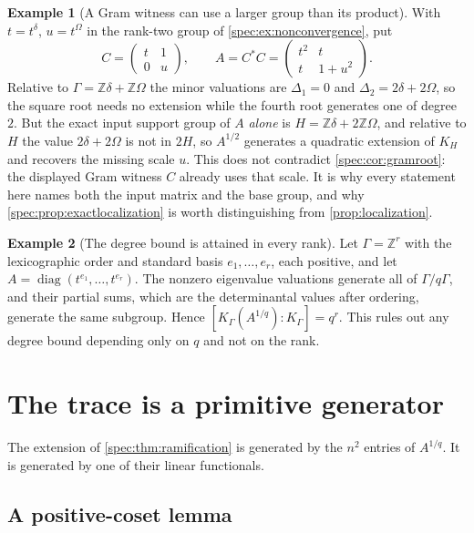 \documentclass[11pt,a4paper]{article}
\numberwithin{equation}{section}
\theoremstyle{definition}
\newtheorem{example}[example]{Example}
\theoremstyle{remark}
\newcommand{\Z}{\mathbb Z}
\newcommand{\diag}{\operatorname{diag}}
\begin{document}
\begin{example}[A Gram witness can use a larger group than its product]\label{spec:ex:gramwitness}
With $t=t^\delta$, $u=t^\Omega$ in the rank-two group of
\cref{spec:ex:nonconvergence}, put
\[
 C=\begin{pmatrix}t&1\\0&u\end{pmatrix},\qquad
 A=C^*C=\begin{pmatrix}t^2&t\\t&1+u^2\end{pmatrix}.
\]
Relative to $\Gamma=\Z\delta+\Z\Omega$ the minor valuations are
$\Delta_1=0$ and $\Delta_2=2\delta+2\Omega$, so the square root needs no
extension while the fourth root generates one of degree $2$. But the exact
input support group of $A$ \emph{alone} is $H=\Z\delta+2\Z\Omega$, and
relative to $H$ the value $2\delta+2\Omega$ is not in $2H$, so $A^{1/2}$
generates a quadratic extension of $K_H$ and recovers the missing scale $u$.
This does not contradict \cref{spec:cor:gramroot}: the displayed Gram
witness $C$ already uses that scale. It is why every statement here names
both the input matrix and the base group, and why
\cref{spec:prop:exactlocalization} is worth distinguishing from
\cref{prop:localization}.
\end{example}

\begin{example}[The degree bound is attained in every rank]\label{spec:ex:sharpdegree}
Let $\Gamma=\Z^r$ with the lexicographic order and standard basis
$e_1,\ldots,e_r$, each positive, and let
$A=\diag(t^{e_1},\ldots,t^{e_r})$. The nonzero eigenvalue valuations
generate all of $\Gamma/q\Gamma$, and their partial sums, which are the
determinantal values after ordering, generate the same subgroup. Hence
$[K_\Gamma(A^{1/q}):K_\Gamma]=q^r$. This rules out any degree bound
depending only on $q$ and not on the rank.
\end{example}

\section{The trace is a primitive generator}
\label{spec:sec:trace}

The extension of \cref{spec:thm:ramification} is generated by the $n^2$
entries of $A^{1/q}$. It is generated by one of their linear functionals.

\subsection{A positive-coset lemma}
\end{document}
